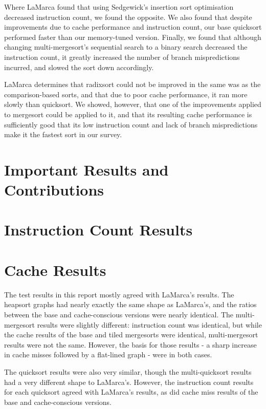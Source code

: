 Where LaMarca found that using Sedgewick's insertion sort optimisation decreased
instruction count, we found the opposite. We also found that despite
improvements due to cache performance and instruction count, our base quicksort
performed faster than our memory-tuned version. Finally, we found that although
changing multi-mergesort's sequential search to a binary search decreased the
instruction count, it greatly increased the number of branch mispredictions
incurred, and slowed the sort down accordingly.

LaMarca determines that radixsort could not be improved in the same was as the
comparison-based sorts, and that due to poor cache performance, it ran more
slowly than quicksort. We showed, however, that one of the improvements applied
to mergesort could be applied to it, and that its resulting cache performance is
sufficiently good that its low instruction count and lack of branch
mispredictions make it the fastest sort in our survey.


\section{Important Results and Contributions}


\section{Instruction Count Results}

\section{Cache Results}

The test results in this report mostly agreed with LaMarca's results.  The
heapsort graphs had nearly exactly the same shape as LaMarca's, and the ratios
between the base and cache-conscious versions were nearly identical. The
multi-mergesort results were slightly different: instruction count was
identical, but while the cache results of the base and tiled mergesorts were
identical, multi-mergesort results were not the same. However, the basis for
those results - a sharp increase in cache misses followed by a flat-lined graph
- were in both cases.

The quicksort results were also very similar, though the multi-quicksort results
had a very different shape to LaMarca's. However, the instruction count
results for each quicksort agreed with LaMarca's results, as did cache miss
results of the base and cache-conscious versions.

